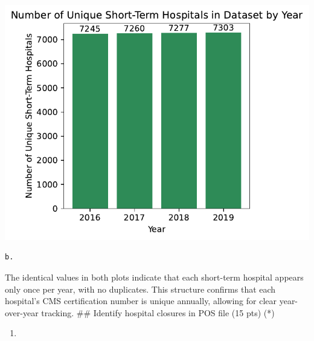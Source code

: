 \documentclass[
  letterpaper,
  DIV=11,
  numbers=noendperiod]{scrartcl}
\providecommand{\tightlist}{%
  \setlength{\itemsep}{0pt}\setlength{\parskip}{0pt}}\usepackage{longtable,booktabs,array}
\begin{document}
\includegraphics{pset4_template_files/figure-pdf/cell-4-output-1.pdf}

\begin{verbatim}
b. 
\end{verbatim}

The identical values in both plots indicate that each short-term
hospital appears only once per year, with no duplicates. This structure
confirms that each hospital's CMS certification number is unique
annually, allowing for clear year-over-year tracking. \#\# Identify
hospital closures in POS file (15 pts) (*)

\begin{enumerate}
\def\labelenumi{\arabic{enumi}.}
\tightlist
\item
\end{enumerate}
\end{document}
